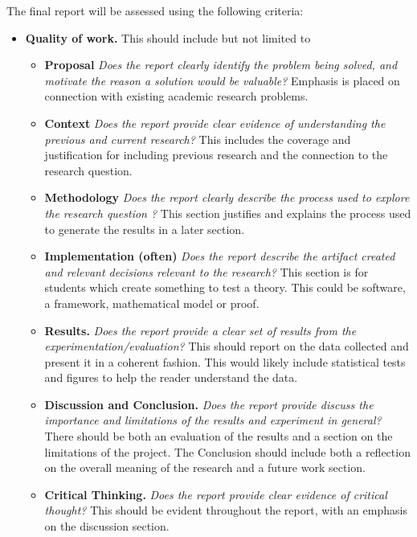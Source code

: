 \noindent The final report will be assessed using the following
criteria:
\begin{itemize}
\item {\bf Quality of work.} This should include but not limited to

\begin{itemize}
  \item {\bf Proposal}  {\em Does the report
    clearly identify the problem being solved, and motivate the reason
    a solution would be valuable?}  Emphasis is placed on connection with existing academic research problems.

  \item {\bf Context}  {\em Does the report provide clear evidence of understanding the previous and current research?}  This includes the coverage and justification for including previous research and the connection to the research question.

  \item {\bf Methodology}  {\em Does the report clearly describe the process used to explore the research question ?}  This section justifies and explains the process used to generate the results in a later section.
  
   \item {\bf Implementation (often)}  {\em Does the report describe the artifact created and relevant decisions relevant to the research?}  This section is for students which create something to test a theory. This could be software, a framework, mathematical model or proof. 

  \item {\bf Results.}  {\em Does the report provide a clear set of results from the experimentation/evaluation?}    This should report on the data collected and present it in a coherent fashion. This would likely include statistical tests and figures to help the reader understand the data. 

  \item {\bf Discussion and Conclusion.}  {\em Does the report provide discuss the importance and limitations of the results and experiment in general?}  There should be both an evaluation of the results and a section on the limitations of the project. The Conclusion should include both a reflection on the overall meaning of the research and a future work section. 

  \item {\bf Critical Thinking.}  {\em Does the report provide clear
    evidence of critical thought?}  This should be evident throughout
  the report, with an emphasis on the discussion section.
  \end{itemize}


\end{itemize}

